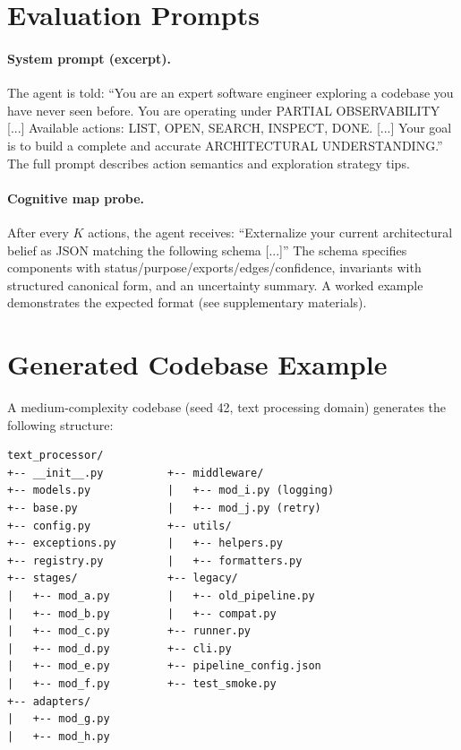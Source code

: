 \documentclass{article}
\begin{document}
\section{Evaluation Prompts}
\label{app:prompts}

\paragraph{System prompt (excerpt).} The agent is told: ``You are an expert software engineer exploring a codebase you have never seen before. You are operating under PARTIAL OBSERVABILITY [...]  Available actions: LIST, OPEN, SEARCH, INSPECT, DONE. [...] Your goal is to build a complete and accurate ARCHITECTURAL UNDERSTANDING.'' The full prompt describes action semantics and exploration strategy tips.

\paragraph{Cognitive map probe.} After every $K$ actions, the agent receives: ``Externalize your current architectural belief as JSON matching the following schema [...]'' The schema specifies components with status/purpose/exports/edges/confidence, invariants with structured canonical form, and an uncertainty summary. A worked example demonstrates the expected format (see supplementary materials).

\section{Generated Codebase Example}
\label{app:example}

A medium-complexity codebase (seed 42, text processing domain) generates the following structure:
\begin{verbatim}
text_processor/
+-- __init__.py          +-- middleware/
+-- models.py            |   +-- mod_i.py (logging)
+-- base.py              |   +-- mod_j.py (retry)
+-- config.py            +-- utils/
+-- exceptions.py        |   +-- helpers.py
+-- registry.py          |   +-- formatters.py
+-- stages/              +-- legacy/
|   +-- mod_a.py         |   +-- old_pipeline.py
|   +-- mod_b.py         |   +-- compat.py
|   +-- mod_c.py         +-- runner.py
|   +-- mod_d.py         +-- cli.py
|   +-- mod_e.py         +-- pipeline_config.json
|   +-- mod_f.py         +-- test_smoke.py
+-- adapters/
|   +-- mod_g.py
|   +-- mod_h.py
\end{verbatim}
\end{document}
